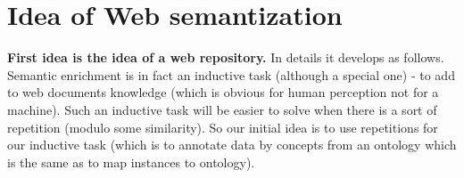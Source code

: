 \documentclass{sig-alternate}
\begin{document}
%







\section{Idea of Web semantization}

\textbf{First idea is the idea of a web repository.} In details it develops as follows. Semantic enrichment is in fact an inductive task (although a special one) - to add to web documents knowledge (which is obvious for human perception not for a machine). Such an inductive task will be easier to solve when there is a sort of repetition (modulo some similarity). So our initial idea is to use repetitions for our inductive task (which is to annotate data by concepts from an ontology which is the same as to map instances to ontology). 
\end{document}
